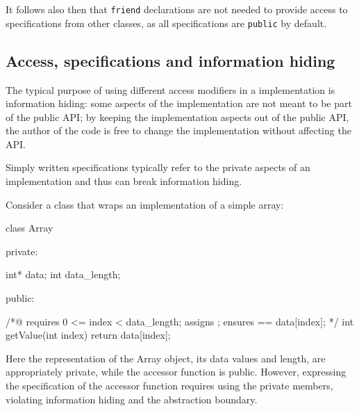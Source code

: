It follows also then that \lstinline|friend| declarations are not 
needed to provide access to \NAME{} specifications from other classes,
as all specifications are \lstinline|public| by default.
 
\subsection{Access, specifications and information hiding}

The typical purpose of using different access modifiers in a
\lang{} implementation is information hiding: some aspects of
the implementation are not meant to be part of the public API;
by keeping the implementation aspects out of the public API, the
author of the code is free to change the implementation without
affecting the API.

Simply written specifications typically refer to the private
aspects of an implementation and thus can break information hiding.

%
Consider a class that wraps an implementation of a simple array:

\begin{listing-nonumber}
class Array {
	
  private:
	
	int* data;
	int data_length;

  public:
	
	/*@ 
	requires 0 <= index < data_length;
	assigns \nothing;
	ensures \result == data[index];
	*/
	int getValue(int index) {
		return data[index];
	}
}
\end{listing-nonumber}

Here the representation of the Array object, its data values and length, are appropriately private, while the accessor function is public.
However, expressing the specification of the accessor function requires using the private members, violating information hiding and
the abstraction boundary.

